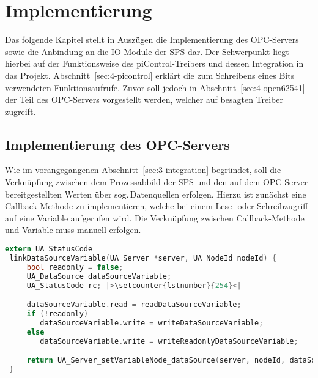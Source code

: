 % 
% 
% 
% 
% 
% 
% 
% 

\section{Implementierung%
  \label{sec:4-implementierung}}
Das folgende Kapitel stellt in Auszügen die Implementierung des OPC-Servers sowie die Anbindung an die IO-Module
der SPS dar. Der Schwerpunkt liegt hierbei auf der Funktionsweise des piControl-Treibers und dessen Integration in das Projekt. Abschnitt~\ref{sec:4-picontrol} erklärt die zum Schreibens eines Bits verwendeten Funktionsaufrufe.
Zuvor soll jedoch in Abschnitt~\ref{sec:4-open62541} der Teil des OPC-Servers vorgestellt werden, welcher auf besagten Treiber zugreift. 

\subsection{Implementierung des OPC-Servers%
     \label{sec:4-open62541}}
Wie im vorangegangenen Abschnitt~\ref{sec:3-integration} begründet, soll die Verknüpfung zwischen dem Prozessabbild der SPS und den auf dem OPC-Server bereitgestellten Werten über sog.\,Datenquellen erfolgen. Hierzu ist zunächst eine Callback-Methode zu implementieren, welche bei einem Lese- oder Schreibzugriff auf eine Variable aufgerufen wird. Die Verknüpfung zwischen Callback-Methode und Variable muss manuell erfolgen.

\begin{lstlisting}[language={c},firstnumber=237,caption={Auszug der Methode \lstinline{linkDataSourceVariable} in \lstinline{variables.c}\label{lst:4-linkDataSourceVariable}}]
extern UA_StatusCode
 linkDataSourceVariable(UA_Server *server, UA_NodeId nodeId) {
     bool readonly = false;
     UA_DataSource dataSourceVariable;
     UA_StatusCode rc; |>\setcounter{lstnumber}{254}<|

     dataSourceVariable.read = readDataSourceVariable;
     if (!readonly)
        dataSourceVariable.write = writeDataSourceVariable;
     else
        dataSourceVariable.write = writeReadonlyDataSourceVariable;

     return UA_Server_setVariableNode_dataSource(server, nodeId, dataSourceVariable);
 }
\end{lstlisting}

